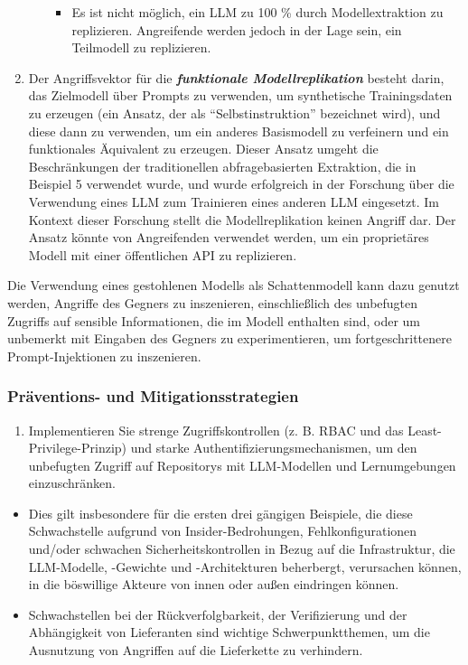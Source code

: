 \documentclass[
]{article}
\providecommand{\tightlist}{%
  \setlength{\itemsep}{0pt}\setlength{\parskip}{0pt}}
\begin{document}
\begin{enumerate}
\begin{itemize}
    \begin{itemize}
    \tightlist
    \item
      Es ist nicht möglich, ein LLM zu 100 \% durch Modellextraktion zu
      replizieren. Angreifende werden jedoch in der Lage sein, ein
      Teilmodell zu replizieren.
    \end{itemize}
  \end{itemize}
\item
  Der Angriffsvektor für die \textbf{\emph{funktionale
  Modellreplikation}} besteht darin, das Zielmodell über Prompts zu
  verwenden, um synthetische Trainingsdaten zu erzeugen (ein Ansatz, der
  als ``Selbstinstruktion'' bezeichnet wird), und diese dann zu
  verwenden, um ein anderes Basismodell zu verfeinern und ein
  funktionales Äquivalent zu erzeugen. Dieser Ansatz umgeht die
  Beschränkungen der traditionellen abfragebasierten Extraktion, die in
  Beispiel 5 verwendet wurde, und wurde erfolgreich in der Forschung
  über die Verwendung eines LLM zum Trainieren eines anderen LLM
  eingesetzt. Im Kontext dieser Forschung stellt die Modellreplikation
  keinen Angriff dar. Der Ansatz könnte von Angreifenden verwendet
  werden, um ein proprietäres Modell mit einer öffentlichen API zu
  replizieren.
\end{enumerate}

Die Verwendung eines gestohlenen Modells als Schattenmodell kann dazu
genutzt werden, Angriffe des Gegners zu inszenieren, einschließlich des
unbefugten Zugriffs auf sensible Informationen, die im Modell enthalten
sind, oder um unbemerkt mit Eingaben des Gegners zu experimentieren, um
fortgeschrittenere Prompt-Injektionen zu inszenieren.

\subsubsection{Präventions- und
Mitigationsstrategien}\label{pruxe4ventions--und-mitigationsstrategien}

\begin{enumerate}
\def\labelenumi{\arabic{enumi}.}
\tightlist
\item
  Implementieren Sie strenge Zugriffskontrollen (z. B. RBAC und das
  Least-Privilege-Prinzip) und starke Authentifizierungsmechanismen, um
  den unbefugten Zugriff auf Repositorys mit LLM-Modellen und
  Lernumgebungen einzuschränken.
\end{enumerate}

\begin{itemize}
\tightlist
\item
  Dies gilt insbesondere für die ersten drei gängigen Beispiele, die
  diese Schwachstelle aufgrund von Insider-Bedrohungen,
  Fehlkonfigurationen und/oder schwachen Sicherheitskontrollen in Bezug
  auf die Infrastruktur, die LLM-Modelle, -Gewichte und -Architekturen
  beherbergt, verursachen können, in die böswillige Akteure von innen
  oder außen eindringen können.
\item
  Schwachstellen bei der Rückverfolgbarkeit, der Verifizierung und der
  Abhängigkeit von Lieferanten sind wichtige Schwerpunktthemen, um die
  Ausnutzung von Angriffen auf die Lieferkette zu verhindern.
\end{itemize}
\end{document}
